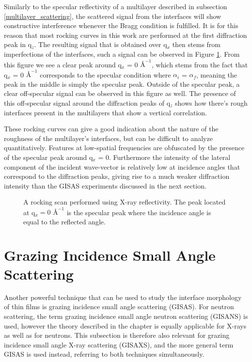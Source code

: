 Similarly to the specular reflectivity of a multilayer described in subsection \ref{multilayer_scattering}, the scattered signal from the interfaces will show constructive interference whenever the Bragg condition is fulfilled. It is for this reason that most rocking curves in this work are performed at the first diffraction peak in q$_z$. The resulting signal that is obtained over q$_x$ then stems from imperfections of the interfaces, such a signal can be observed in Figure \ref{rocking_curve_figure}. From this figure we see a clear peak around q$_x$ = 0 $Å^{-1}$, which stems from the fact that q$_x$ =  0 $Å^{-1}$ corresponds to the specular condition where $\alpha_i$ = $\alpha_f$, meaning the peak in the middle is simply the specular peak. Outside of the specular peak, a clear off-specular signal can be observed in this figure as well. The presence of this off-specular signal around the diffraction peaks of q$_z$ shows how there's rough interfaces present in the multilayers that show a vertical correlation. 

These rocking curves can give a good indication about the nature of the roughness of the multilayer's interfaces, but can be difficult to analyze quantitatively. Features at low-spatial frequencies are obfuscated by the presence of the specular peak around q$_x$ = 0. Furthermore the intensity of the lateral component of the incident wave-vector is relatively low at incidence angles that correspond to the diffraction peaks, giving rise to a much weaker diffraction intensity than the GISAS experiments discussed in the next section.
\begin{figure}
	\centering
	\def\svgwidth{\textwidth}
	
	\caption{A rocking scan performed using X-ray reflectivity. The peak located at q$_x = 0$ $Å^{-1}$ is the specular peak where the incidence angle is equal to the reflected angle.}
	\label{rocking_curve_figure}
\end{figure}

\section{Grazing Incidence Small Angle Scattering}\label{GISANS_section}
Another powerful technique that can be used to study the interface morphology of thin films is grazing incidence small angle scattering (GISAS). For neutron scattering, the term grazing incidence small angle neutron scattering (GISANS) is used, however the theory described in the chapter is equally applicable for X-rays as well as for neutrons. This subsection is therefore also relevant for grazing incidence small angle X-ray scattering (GISAXS), and the more general term GISAS is used instead, referring to both techniques simultaneously. 
